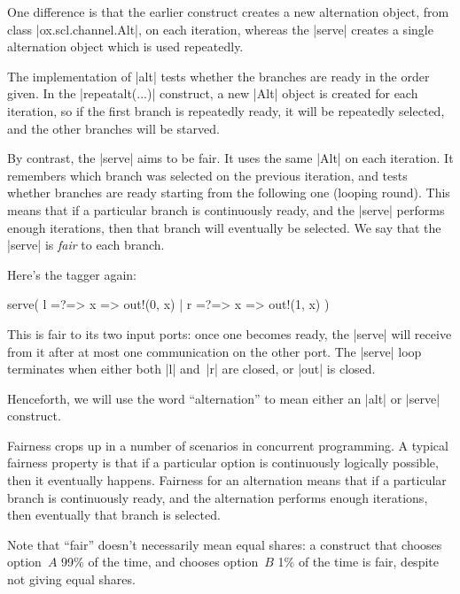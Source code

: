One difference is that the earlier construct creates a new alternation object,
from class |ox.scl.channel.Alt|, on each iteration, whereas the |serve|
creates a single alternation object which is used repeatedly.


The implementation of  |alt| tests whether the branches are ready in the order
given.  In the |repeat{alt(...)}| construct, a new |Alt| object is created
for each iteration, so if the first branch is repeatedly ready, it will be
repeatedly selected, and the other branches will be starved.

By contrast, the |serve| aims to be fair.  It uses the same |Alt| on each
iteration.  It remembers which branch was selected on the previous iteration,
and tests whether branches are ready starting from the following one (looping
round).
%
This means that if a particular branch is continuously ready, and the |serve|
performs enough iterations, then that branch will eventually be selected.  We
say that the |serve| is \emph{fair} to each branch.



Here's the tagger again:
%
\begin{scala}
  serve( l =?=> { x => out!(0, x) } | r =?=> { x => out!(1, x) } )
\end{scala}
%
This is fair to its two input ports: once one becomes ready, the
|serve| will receive from it after at most one communication on the other
port.
%
The |serve| loop terminates when either both |l| and~|r| are closed, or |out|
is closed. 

Henceforth, we will use the word ``alternation'' to mean either an |alt| or
|serve| construct. 



Fairness crops up in a number of scenarios in concurrent programming.
%
A typical fairness property is that if a particular option is continuously
logically possible, then it eventually happens.  Fairness for an alternation
means that if a particular branch is continuously ready, and the alternation
performs enough iterations, then eventually that branch is selected.

Note that ``fair'' doesn't necessarily mean equal shares: a construct that
chooses option~$A$ 99\% of the time, and chooses option~$B$ 1\% of the time is
fair, despite not giving equal shares.

